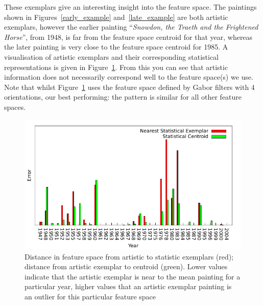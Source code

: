 These exemplars give an interesting insight into the feature space. The paintings shown in 
Figures~\ref{early_example} and~\ref{late_example} are both artistic exemplars, however the 
earlier painting ``\emph{Snowdon, the Traeth and the Frightened Horse}'', from 1948, is far from 
the feature space centroid for that year, whereas the later painting is very close to the feature 
space centroid for 1985. A visualisation of artistic exemplars and their corresponding statistical
representations is given in Figure~\ref{art_ex_stat_ex}. From this you can see that artistic 
information does not necessarily correspond well to the feature space(s) we use. Note that whilst 
Figure~\ref{art_ex_stat_ex} uses the feature space defined by Gabor filters with 4 orientations, 
our best performing: the pattern is similar for all other feature spaces.

\begin{figure}[h]
\includegraphics[width=\linewidth]{img/exemplar.pdf}
\caption[Distance in feature space from artistic to statistic exemplars]{Distance in feature space from artistic to statistic exemplars (red); distance from 
artistic exemplar to centroid (green). Lower values indicate that the artistic exemplar is near to
the mean painting for a particular year, higher values that an artistic exemplar painting is an 
outlier for this particular feature space\label{art_ex_stat_ex}}
\end{figure}



